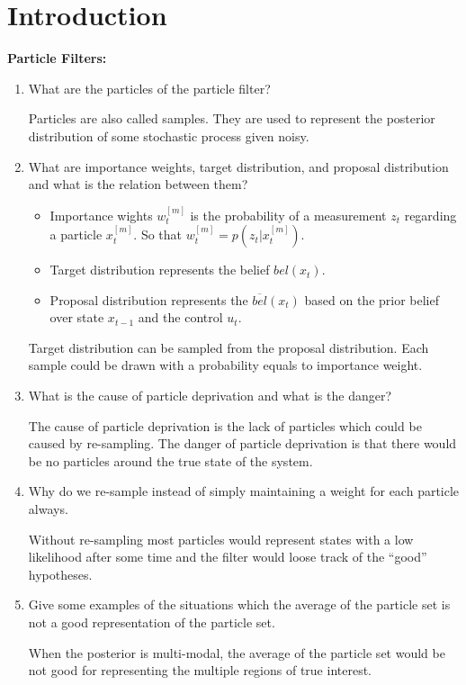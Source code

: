 \documentclass[11pt,a4paper]{article}
\begin{document}
\section{Introduction}
\par \textbf{Particle Filters:}
\begin{enumerate}
	\item What are the particles of the particle filter?
		\par Particles are also called samples. They are used to represent the posterior distribution of some stochastic process given noisy.

	\item What are importance weights, target distribution, and proposal distribution and what is the relation between them?
		\begin{itemize}
			\item Importance wights $w_t^{[m]}$ is the probability of a measurement $z_t$ regarding a particle $x_t^{[m]}$. So that $w_t^{[m]} = p(z_t | x_t^{[m]})$.
			\item Target distribution represents the belief $bel(x_t)$. 
			\item Proposal distribution represents the $\overline{bel}(x_t)$ based on the prior belief over state $x_{t-1}$ and the control $u_{t}$.
		\end{itemize}
		\par Target distribution can be sampled from the proposal distribution. Each sample could be drawn with a probability equals to importance weight.

	\item What is the cause of particle deprivation and what is the danger?
		\par The cause of particle deprivation is the lack of particles which could be caused by re-sampling. The danger of particle deprivation is that there would be no particles around the true state of the system.

	\item Why do we re-sample instead of simply maintaining a weight for each particle always.
		\par Without re-sampling most particles would represent states with a low likelihood after some time and the filter would loose track of the ``good'' hypotheses.

	\item Give some examples of the situations which the average of the particle set is not a good representation of the particle set.
		\par When the posterior is multi-modal, the average of the particle set would be not good for representing the multiple regions of true interest.


\end{enumerate}
\end{document}
